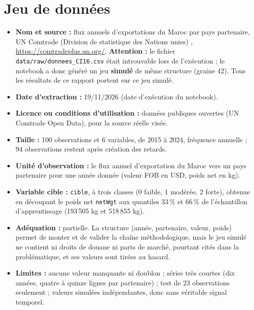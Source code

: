 \documentclass[11pt,a4paper]{article}
\begin{document}
\section{Jeu de données}
\label{sec:donnees}
\begin{itemize}
  \item \textbf{Nom et source :} flux annuels d'exportations du Maroc par pays partenaire, UN Comtrade (Division de statistique des Nations unies) \cite{donnees}, \url{https://comtradeplus.un.org/}. \textbf{Attention :} le fichier \texttt{data/raw/donnees\_CI16.csv} était introuvable lors de l'exécution ; le notebook a donc généré un jeu \textbf{simulé} de même structure (graine 42). Tous les résultats de ce rapport portent sur ce jeu simulé.
  \item \textbf{Date d'extraction :} 19/11/2026 (date d'exécution du notebook).
  \item \textbf{Licence ou conditions d'utilisation :} données publiques ouvertes (UN Comtrade Open Data), pour la source réelle visée.
  \item \textbf{Taille :} 100 observations et 6 variables, de 2015 à 2024, fréquence annuelle ; 94 observations restent après création des retards.
  \item \textbf{Unité d'observation :} le flux annuel d'exportation du Maroc vers un pays partenaire pour une année donnée (valeur FOB en USD, poids net en kg).
  \item \textbf{Variable cible :} \texttt{cible}, à trois classes (0 faible, 1 modérée, 2 forte), obtenue en découpant le poids net \texttt{netWgt} aux quantiles 33\,\% et 66\,\% de l'échantillon d'apprentissage (193\,505 kg et 518\,855 kg).
  \item \textbf{Adéquation :} partielle. La structure (année, partenaire, valeur, poids) permet de monter et de valider la chaîne méthodologique, mais le jeu simulé ne contient ni droits de douane ni parts de marché, pourtant cités dans la problématique, et ses valeurs sont tirées au hasard.
  \item \textbf{Limites :} aucune valeur manquante ni doublon ; séries très courtes (dix années, quatre à quinze lignes par partenaire) ; test de 23 observations seulement ; valeurs simulées indépendantes, donc sans véritable signal temporel.
\end{itemize}
\end{document}
